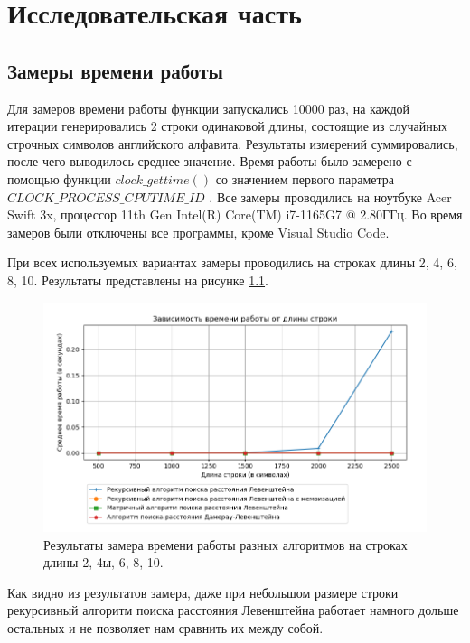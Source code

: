 \chapter{Исследовательская часть}

\section{Замеры времени работы}

Для замеров времени работы функции запускались 10000 раз, на каждой итерации генерировались 2 строки одинаковой длины, состоящие из случайных строчных символов английского алфавита. Результаты измерений суммировались, после чего выводилось среднее значение. Время работы было замерено с помощью функции $clock\_gettime()$ со значением первого параметра $CLOCK\_PROCESS\_CPUTIME\_ID$ \cite{clockgettime}. Все замеры проводились на ноутбуке Acer Swift 3x, процессор 11th Gen Intel(R) Core(TM) i7-1165G7 @ 2.80ГГц. Во время замеров были отключены все программы, кроме Visual Studio Code.

При всех используемых вариантах замеры проводились на строках длины 2, 4, 6, 8, 10. Результаты представлены на рисунке \ref{fig:res1}.

\begin{figure}[h!]
	\centering
	\includegraphics[width=1\textwidth]{tex_parts/research1.png}
	\caption{\label{fig:res1} Результаты замера времени работы разных алгоритмов на строках длины 2, 4ы, 6, 8, 10.}
\end{figure}

Как видно из результатов замера, даже при небольшом размере строки рекурсивный алгоритм поиска расстояния Левенштейна работает намного дольше остальных и не позволяет нам сравнить их между собой.

